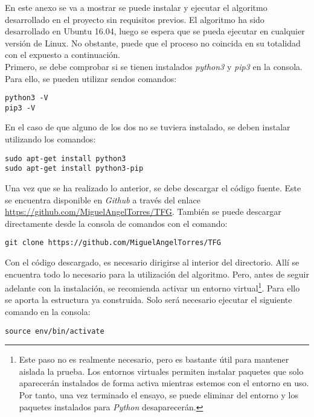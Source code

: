 \begin{appendices}
En este anexo se va a mostrar se puede instalar y ejecutar el algoritmo desarrollado en el proyecto sin requisitos previos. El algoritmo ha sido desarrollado en Ubuntu 16.04, luego se espera que se pueda ejecutar en cualquier versi\'on de Linux. No obstante, puede que el proceso no coincida en su totalidad con el expuesto a continuaci\'on.\\

Primero, se debe comprobar si se tienen instalados \textit{python3} y \textit{pip3} en la consola. Para ello, se pueden utilizar sendos comandos:

\begin{lstlisting}[basicstyle=\small]
python3 -V
pip3 -V
\end{lstlisting}

En el caso de que alguno de los dos no se tuviera instalado, se deben instalar utilizando los comandos:

\begin{lstlisting}[basicstyle=\small]
sudo apt-get install python3
sudo apt-get install python3-pip
\end{lstlisting}

Una vez que se ha realizado lo anterior, se debe descargar el c\'odigo fuente. Este se encuentra disponible en \textit{Github} a trav\'es del enlace \url{https://github.com/MiguelAngelTorres/TFG}. Tambi\'en se puede descargar directamente desde la consola de comandos con el comando:

\begin{lstlisting}[basicstyle=\small]
git clone https://github.com/MiguelAngelTorres/TFG
\end{lstlisting}

Con el c\'odigo descargado, es necesario dirigirse al interior del directorio. All\'i se encuentra todo lo necesario para la utilizaci\'on del algoritmo. Pero, antes de seguir adelante con la instalaci\'on, se recomienda activar un entorno virtual\footnote{Este paso no es realmente necesario, pero es bastante \'util para mantener aislada la prueba. Los entornos virtuales permiten instalar paquetes que solo aparecer\'an instalados de forma activa mientras estemos con el entorno en uso. Por tanto, una vez terminado el ensayo, se puede eliminar del entorno y los paquetes instalados para \textit{Python} desaparecer\'an.}. Para ello se aporta la estructura ya construida. Solo ser\'a necesario ejecutar el siguiente comando en la consola:

\begin{lstlisting}[basicstyle=\small]
source env/bin/activate
\end{lstlisting}


\end{appendices}
